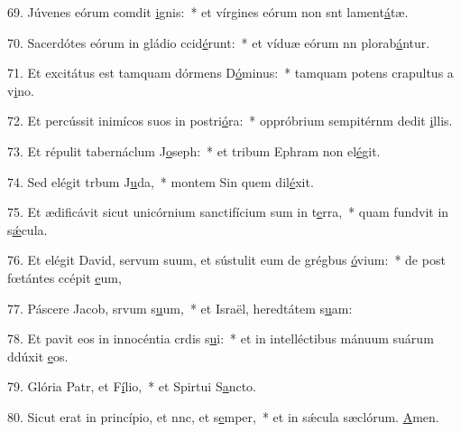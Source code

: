 69. Júvenes eórum comdit \uline{i}gnis:~* et vírgines eórum non snt lament\uline{á}tæ.\par 
70. Sacerdótes eórum in gládio ccid\uline{é}runt:~* et víduæ eórum nn plorab\uline{á}ntur.\par 
71. Et excitátus est tamquam dórmens D\uline{ó}minus:~* tamquam potens crapultus a v\uline{i}no.\par 
72. Et percússit inimícos suos in postri\uline{ó}ra:~* oppróbrium sempitérnm dedit \uline{i}llis.\par 
73. Et répulit tabernáclum J\uline{o}seph:~* et tribum Ephram non el\uline{é}git.\par 
74. Sed elégit trbum J\uline{u}da,~* montem Sin quem dil\uline{é}xit.\par 
75. Et ædificávit sicut unicórnium sanctifícium sum in t\uline{e}rra,~* quam fundvit in s\uline{ǽ}cula.\par 
76. Et elégit David, servum suum, et sústulit eum de grégbus \uline{ó}vium:~* de post fœtántes ccépit \uline{e}um,\par 
77. Páscere Jacob, srvum s\uline{u}um,~* et Israël, heredtátem s\uline{u}am:\par 
78. Et pavit eos in innocéntia crdis s\uline{u}i:~* et in intelléctibus mánuum suárum ddúxit \uline{e}os.\par 
79. Glória Patr, et F\uline{í}lio,~* et Spirtui S\uline{a}ncto.\par 
80. Sicut erat in princípio, et nnc, et s\uline{e}mper,~* et in sǽcula sæclórum. \uline{A}men.\par 
